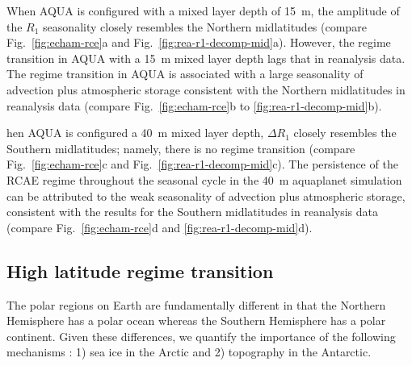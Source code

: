 \documentclass{ametsocV5}
\begin{document}

  When AQUA is configured with a mixed layer depth of 15~m, the amplitude of the \(R_{1}\) seasonality closely resembles the Northern midlatitudes (compare Fig.~\ref{fig:echam-rce}a and Fig.~\ref{fig:rea-r1-decomp-mid}a). However, the regime transition in AQUA with a 15~m mixed layer depth lags that in reanalysis data. The regime transition in AQUA is associated with a large seasonality of advection plus atmospheric storage\added{,} consistent with the Northern midlatitudes in reanalysis data (compare Fig.~\ref{fig:echam-rce}b to \ref{fig:rea-r1-decomp-mid}b). 
  
  hen AQUA is configured a 40~m mixed layer depth, \(\Delta R_{1}\) closely resembles the Southern midlatitudes; namely, there is no regime transition (compare Fig.~\ref{fig:echam-rce}c and Fig.~\ref{fig:rea-r1-decomp-mid}c). The persistence of the RCAE regime throughout the seasonal cycle in the 40~m aquaplanet simulation can be attributed to the weak seasonality of advection plus atmospheric storage, consistent with the results for the Southern midlatitudes in reanalysis data (compare Fig.~\ref{fig:echam-rce}d and \ref{fig:rea-r1-decomp-mid}d).

  \subsection{High latitude regime transition} \label{subsec:ice}
  The polar regions on Earth are fundamentally different in that the Northern Hemisphere has a polar ocean whereas the Southern Hemisphere has a polar continent. Given these differences, we quantify the importance of the following mechanisms : 1) sea ice in the Arctic and 2) topography in the Antarctic.
  
\end{document}

